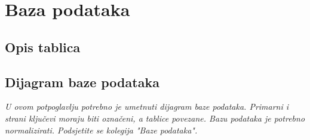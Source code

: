 				
		\section{Baza podataka}
			
			
		
			\subsection{Opis tablica}
			

				
				
				
				
			
			\subsection{Dijagram baze podataka}
				\textit{ U ovom potpoglavlju potrebno je umetnuti dijagram baze podataka. Primarni i strani ključevi moraju biti označeni, a tablice povezane. Bazu podataka je potrebno normalizirati. Podsjetite se kolegija "Baze podataka".}
			
